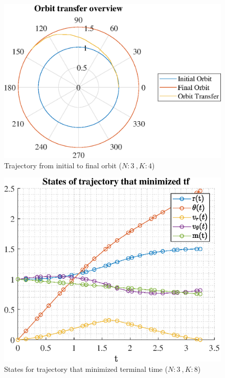 \documentclass[]{article}
\begin{document}
	\begin{figure}
		\centering
		\includegraphics[scale=0.75]{orbit_N3_K4_C2_tf.eps}
		\caption{Trajectory from initial to final orbit (\(N:3\ , K:4\))}
		\label{fig:orbit_N3_K4_C2_tf}
	\end{figure}
	\begin{figure}
		\centering
		\includegraphics[scale=0.75]{states_N3_K8_C2_tf.eps}
		\caption{States for trajectory that minimized terminal time (\(N:3\ , K:8\))}
		\label{fig:states_N3_K8_C2_tf}
	\end{figure}
\end{document}
